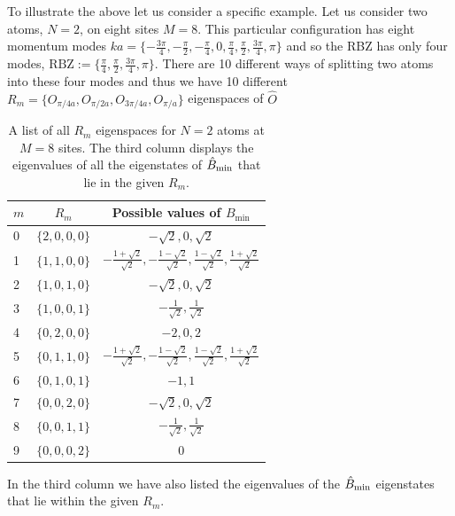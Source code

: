 To illustrate the above let us consider a specific example. Let us
consider two atoms, $N=2$, on eight sites $M=8$. This particular
configuration has eight momentum modes
$ka = \{-\frac{3\pi}{4}, -\frac{\pi}{2}, -\frac{\pi}{4}, 0,
\frac{\pi}{4}, \frac{\pi}{2}, \frac{3\pi}{4}, \pi\}$ and so the RBZ
has only four modes,
$\mathrm{RBZ} := \{\frac{\pi}{4}, \frac{\pi}{2}, \frac{3\pi}{4},
\pi\}$. There are 10 different ways of splitting two atoms into these
four modes and thus we have 10 different
$R_m = \{O_{\pi/4a}, O_{\pi/2a} ,O_{3\pi/4a} ,O_{\pi/a}\}$ eigenspaces
of $\hat{O}$
\begin{table}[!htbp]
  \centering
  \begin{tabular}{l c c}
    \toprule
    $m$ & $R_m$ & Possible values of $B_\mathrm{min}$ \\ \midrule
    0 & $\{2,0,0,0\}$ & $ -\sqrt{2}, 0, \sqrt{2}  $ \\
    1 & $\{1,1,0,0\}$ & $  -\frac{1 + \sqrt{2}}{\sqrt{2}}, -\frac{1
                        - \sqrt{2}}{\sqrt{2}}, \frac{1
                        - \sqrt{2}}{\sqrt{2}}, \frac{1 +
                        \sqrt{2}}{\sqrt{2}}  $ \\ 
    2 & $\{1,0,1,0\}$ & $  -\sqrt{2}, 0, \sqrt{2}  $ \\
    3 & $\{1,0,0,1\}$ & $  -\frac{1}{\sqrt{2}},
                        \frac{1}{\sqrt{2}}  $ \\
    4 & $\{0,2,0,0\}$ & $  -2, 0, 2  $ \\
    5 & $\{0,1,1,0\}$ & $  -\frac{1 + \sqrt{2}}{\sqrt{2}}, -\frac{1
                        - \sqrt{2}}{\sqrt{2}}, \frac{1
                        - \sqrt{2}}{\sqrt{2}}, \frac{1 +
                        \sqrt{2}}{\sqrt{2}} $ \\
    6 & $\{0,1,0,1\}$ & $  -1, 1  $ \\
    7 & $\{0,0,2,0\}$ & $  -\sqrt{2}, 0, \sqrt{2}  $ \\
    8 & $\{0,0,1,1\}$ & $  -\frac{1}{\sqrt{2}},
                        \frac{1}{\sqrt{2}}  $ \\
    9 & $\{0,0,0,2\}$ & $0$ \\
    \bottomrule
  \end{tabular}
  \caption[Eigenspace Overlaps]{A list of all $R_m$ eigenspaces for $N
    = 2$ atoms at $M = 8$ sites. The third column displays the eigenvalues of
    all the eigenstates of $\hat{B}_\mathrm{min}$ that lie in the given $R_m$.}
  \label{tab:Rm}
\end{table}
In the third column we have also listed the eigenvalues of the $\hat{B}_\mathrm{min}$
eigenstates that lie within the given $R_m$.

